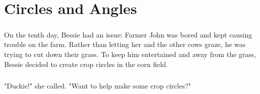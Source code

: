 \chapter{Circles and Angles}
\paragraph{} On the tenth day, Bessie had an issue: Farmer John was bored and kept causing trouble on the farm. Rather than letting her and the other cows graze, he was trying to cut down their grass. To keep him entertained and away from the grass, Bessie decided to create crop circles in the corn field.
\paragraph{} "Duckie!" she called. "Want to help make some crop circles?"
